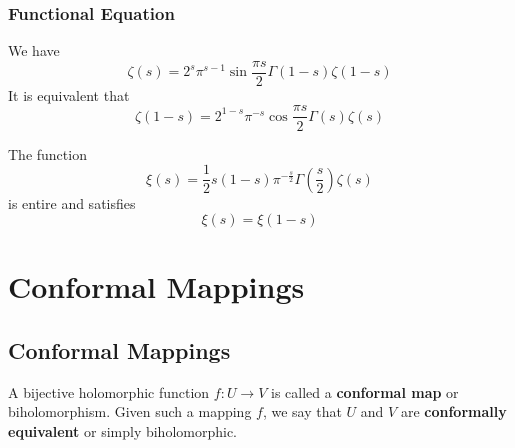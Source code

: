 \documentclass[12pt, oneside]{book}
\begin{document}
\subsection{Functional Equation}
\begin{theorem}
    We have
    \[
        \zeta(s)
        =
        2^s \pi^{s-1} \sin\frac{\pi s}{2} \Gamma(1-s) \zeta(1-s)
    \]
    It is equivalent that
    \[
        \zeta(1-s)
        =
        2^{1-s} \pi^{-s} \cos\frac{\pi s}{2} \Gamma(s) \zeta(s)
    \]
\end{theorem}
\begin{corollary}
    The function
    \[\xi(s)
        =\frac{1}{2} s(1-s) \pi^{-\frac{s}{2}} \Gamma \left( \frac{s}{2}\right) \zeta(s)
    \]
    is entire and satisfies
    \[
        \xi(s) =\xi(1-s)
    \]
\end{corollary}



\chapter{Conformal Mappings}

\section{Conformal Mappings}
\begin{definition}
    A bijective holomorphic function $f:U\longrightarrow V$ is called a \textbf{conformal map} or biholomorphism. Given such a mapping $f$, we say that $U$ and $V$ are \textbf{conformally equivalent} or simply biholomorphic.
\end{definition}
\end{document}
